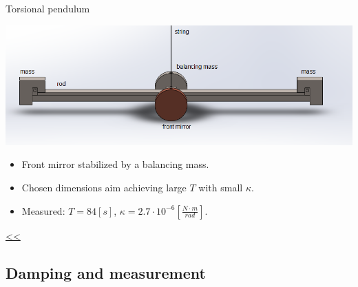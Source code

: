 \documentclass{beamer}
\begin{document}
\begin{frame}{Torsional pendulum}
	\begin{center}		
		\includegraphics[width=1\textwidth,keepaspectratio]{pendulum_front_names.png}
	\end{center}
	\begin{itemize}
		\item Front mirror stabilized by a balancing mass.
		\item Chosen dimensions aim achieving large $T$ with small $\kappa$.
		\item Measured: $T = 84[s]$, $\kappa = 2.7\cdot10^{-6}[\frac{N\cdot m}{rad}]$.
	\end{itemize}
	\hyperlink{frame:Cavendish apparatus}{<<} 

	
\end{frame}




\subsection{Damping and measurement}
\end{document}
